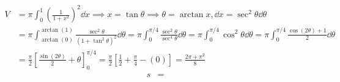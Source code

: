\documentclass{article}
\begin{document}
\begin{tasks}[style = enumerate]
\begin{align*}
				\end{align*}
			\task
				\begin{align*}
					V &= \pi \int_0^1 \left(\frac{1}{1 + x^2}\right)^2 \dd{x}
							\implies x = \tan\theta
							\implies \theta = \arctan x, \dd{x} = \sec^2\theta\dd{\theta} \\
						&= \pi \int_{\arctan(0)}^{\arctan(1)} \frac{\sec^2\theta}{(1 + \tan^2\theta)^2} \dd{\theta}
							= \pi \int_0^{\pi/4} \frac{\sec^2\theta}{\sec^4\theta} \dd{\theta} 
							=  \pi \int_0^{\pi/4} \cos^2\theta \dd{\theta}
							= \pi \int_0^{\pi/4} \frac{\cos(2\theta) + 1}{2} \dd{\theta} \\
						&= \frac{\pi}{2}\left[\frac{\sin(2\theta)}{2} + \theta\right]_0^{\pi/4}
							= \frac{\pi}{2}\left[\frac{1}{2} + \frac{\pi}{4} - (0)\right]
							= \frac{2\pi + \pi^2}{8}
				\end{align*}
			\task
				\begin{align*}
					s &= 
				\end{align*}
		\end{tasks}
\end{document}
